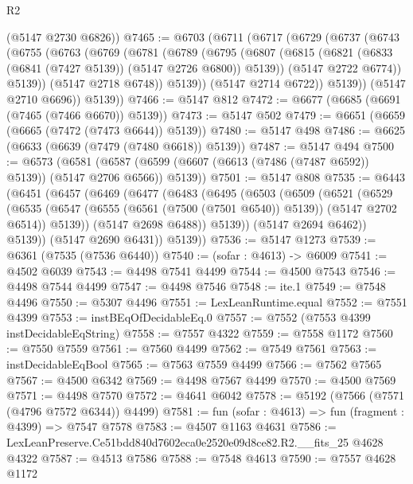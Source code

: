 \begin{lexlean}{R2}
\begin{coremodule}
      (@5147 @2730 @6826))
@7465 := @6703
    (@6711
      (@6717
        (@6729
          (@6737
            (@6743
              (@6755
                (@6763
                  (@6769
                    (@6781
                      (@6789
                        (@6795
                          (@6807
                            (@6815 (@6821 (@6833 (@6841 (@7427 @5139)) (@5147 @2726 @6800)) @5139))
                            (@5147 @2722 @6774))
                          @5139))
                      (@5147 @2718 @6748))
                    @5139))
                (@5147 @2714 @6722))
              @5139))
          (@5147 @2710 @6696))
        @5139))
@7466 := @5147 @812
@7472 := @6677 (@6685 (@6691 (@7465 (@7466 @6670)) @5139))
@7473 := @5147 @502
@7479 := @6651 (@6659 (@6665 (@7472 (@7473 @6644)) @5139))
@7480 := @5147 @498
@7486 := @6625 (@6633 (@6639 (@7479 (@7480 @6618)) @5139))
@7487 := @5147 @494
@7500 := @6573
    (@6581 (@6587 (@6599 (@6607 (@6613 (@7486 (@7487 @6592)) @5139)) (@5147 @2706 @6566)) @5139))
@7501 := @5147 @808
@7535 := @6443
    (@6451
      (@6457
        (@6469
          (@6477
            (@6483
              (@6495
                (@6503
                  (@6509
                    (@6521
                      (@6529
                        (@6535
                          (@6547 (@6555 (@6561 (@7500 (@7501 @6540)) @5139)) (@5147 @2702 @6514))
                          @5139))
                      (@5147 @2698 @6488))
                    @5139))
                (@5147 @2694 @6462))
              @5139))
          (@5147 @2690 @6431))
        @5139))
@7536 := @5147 @1273
@7539 := @6361 (@7535 (@7536 @6440))
@7540 := (sofar : @4613) -> @6009
@7541 := @4502 @6039
@7543 := @4498 @7541 @4499
@7544 := @4500 @7543
@7546 := @4498 @7544 @4499
@7547 := @4498 @7546
@7548 := ite.{1}
@7549 := @7548 @4496
@7550 := @5307 @4496
@7551 := LexLeanRuntime.equal
@7552 := @7551 @4399
@7553 := instBEqOfDecidableEq.{0}
@7557 := @7552 (@7553 @4399 instDecidableEqString)
@7558 := @7557 @4322
@7559 := @7558 @1172
@7560 := @7550 @7559
@7561 := @7560 @4499
@7562 := @7549 @7561
@7563 := instDecidableEqBool
@7565 := @7563 @7559 @4499
@7566 := @7562 @7565
@7567 := @4500 @6342
@7569 := @4498 @7567 @4499
@7570 := @4500 @7569
@7571 := @4498 @7570
@7572 := @4641 @6042
@7578 := @5192 (@7566 (@7571 (@4796 @7572 @6344)) @4499)
@7581 := fun (sofar : @4613) => fun (fragment : @4399) => @7547 @7578
@7583 := @4507 @1163 @4631
@7586 := LexLeanPreserve.Ce51bdd840d7602eca0e2520e09d8ce82.R2.__fits_25 @4628 @4322
@7587 := @4513 @7586
@7588 := @7548 @4613
@7590 := @7557 @4628 @1172

\end{coremodule}
\end{lexlean}
